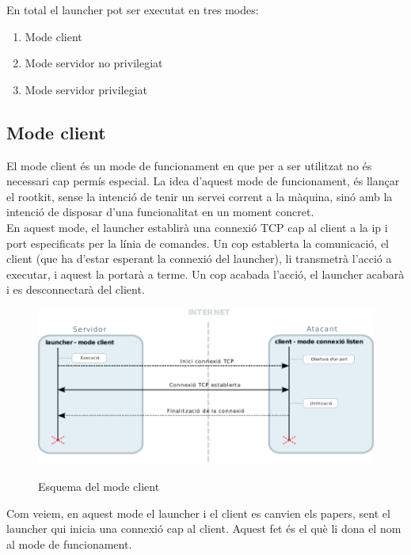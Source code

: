 En total el launcher pot ser executat en tres modes: 

\begin{enumerate}
    \item Mode client
    \item Mode servidor no privilegiat
    \item Mode servidor privilegiat
\end{enumerate}

\subsection{Mode client} 

El mode client és un mode de funcionament en que per a ser utilitzat no és necessari cap permís especial. 
La idea d'aquest mode de funcionament, és llançar el rootkit, sense la intenció de tenir un servei corrent
a la màquina, sinó amb la intenció de disposar d'una funcionalitat en un moment concret. \\

En aquest mode, el launcher establirà una connexió TCP cap al client a la ip i port especificats per la línia
de comandes. Un cop establerta la comunicació, el client (que ha d'estar esperant la connexió del launcher), 
li transmetrà l'acció a executar, i aquest la portarà a terme. Un cop acabada l'acció, el launcher acabarà
i es desconnectarà del client. \\

\begin{figure}[htp]
    \centering
    \includegraphics[scale=1,keepaspectratio]{diagrames/solutionDesignClientMode.pdf} \\
    \caption{Esquema del mode client}
    \label{fig:modeClient}
\end{figure}

Com veiem, en aquest mode el launcher i el client es canvien els papers, sent el launcher qui inicia una connexió 
cap al client. Aquest fet és el què li dona el nom al mode de funcionament. \\

